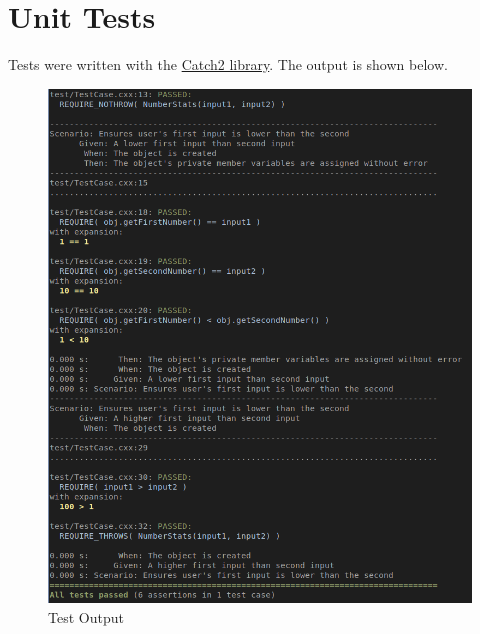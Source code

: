 \documentclass[a4paper, 11pt]{article}
\begin{document}
  \newpage
  \section{Unit Tests}
    Tests were written with the
      \href{https://github.com/catchorg/catch}{Catch2 library}. The output is
      shown below.

    \begin{figure}[H]
      \caption{Test Output}
      \centering
      \includegraphics[width=\textwidth]{testout.png}
    \end{figure}
\end{document}

